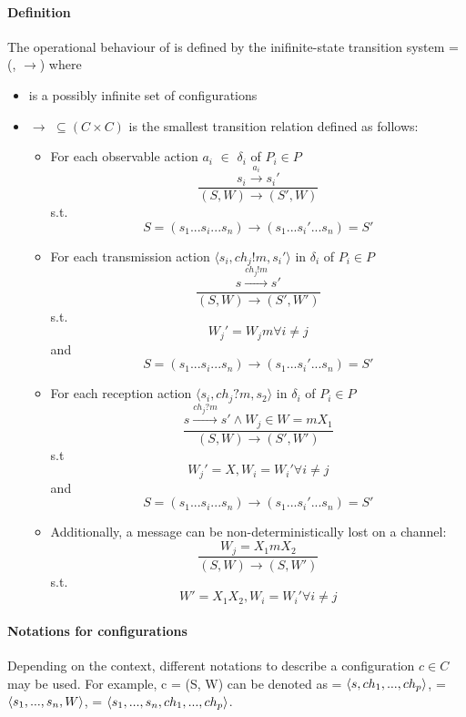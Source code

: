 \paragraph{Definition}
\label{CTS}
The operational behaviour of  is defined by the inifinite-state transition system  = (, $\rightarrow$) where
\begin{itemize}
\item[]
    is a possibly infinite set of configurations
\item[]
  $\rightarrow$ $\subseteq (C \times C)$  is the smallest transition relation defined as follows:
  \begin{itemize}
    \item For each observable action $a_i$ $\in$ $\delta_i$ of $P_i \in P$
      $$\dfrac{s_i \xrightarrow{a_i} s_i'}{(S, W) \rightarrow (S', W)}$$
      s.t.
      $$S = (s_1...s_i...s_n) \rightarrow (s_1...s_i'...s_n) = S'$$
    \item For each transmission action $\langle s_i, ch_j!m, s_i' \rangle$ in $\delta_i$ of $P_i \in P$
      $$\dfrac{s \xrightarrow{ch_j!m} s'}{(S, W) \rightarrow (S', W')}$$
      s.t.
      $$W_j' = W_j m \forall i \neq j$$ and $$S = (s_1...s_i...s_n) \rightarrow (s_1...s_i'...s_n) = S'$$
    \item For each reception action $\langle s_i, ch_j?m, s_2 \rangle$ in $\delta_i$ of $P_i \in P$
      $$\dfrac{s \xrightarrow{ch_j?m} s' \wedge W_j \in W = mX_1 }{(S, W) \rightarrow (S', W')}$$
      s.t
      $$W_j' = X, W_i = W_i' \forall i \neq j$$ and $$S = (s_1...s_i...s_n) \rightarrow (s_1...s_i'...s_n) = S'$$
    \item
      Additionally, a message can be non-deterministically lost on a channel:
      $$\dfrac{W_j = X_1mX_2}{(S, W) \rightarrow (S, W')}$$
      s.t.
      $$W' =X_1X_2, W_i = W_i' \forall i \neq j$$
  \end{itemize}
\end{itemize}

\paragraph{Notations for configurations}
Depending on the context, different notations to describe a configuration $c\in C$ may be used. For example, c = (S, W) can be denoted as  = $\langle s, ch_1,...,ch_p\rangle$,  = $\langle s_1,...,s_n, W\rangle$,  = $\langle s_1,...,s_n, ch_1,...,ch_p\rangle$.

